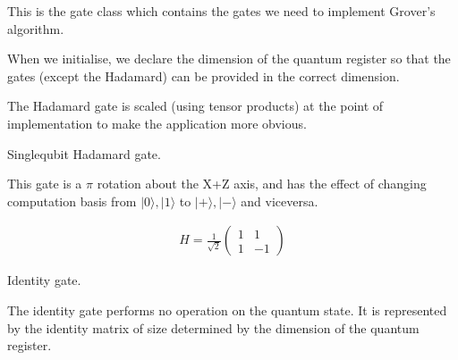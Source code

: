 \documentclass[letterpaper,10pt,english]{sphinxmanual}
\begin{document}
\begin{fulllineitems}
\label{\detokenize{index:gates.Gate}}
\pysigstartsignatures
{}
\pysigstopsignatures
\sphinxAtStartPar
This is the gate class which contains the gates we need to implement
Grover’s algorithm.

\sphinxAtStartPar
When we initialise, we declare the dimension of the quantum
register so that the gates (except the Hadamard) can be provided in
the correct dimension.

\sphinxAtStartPar
The Hadamard gate is scaled (using tensor products) at the point
of implementation to make the application more obvious.

\begin{fulllineitems}
\label{\detokenize{index:gates.Gate.h}}
\pysigstartsignatures
{}
\pysigstopsignatures
\sphinxAtStartPar
Single\sphinxhyphen{}qubit Hadamard gate.

\sphinxAtStartPar
This gate is a \(\pi\) rotation about the X+Z axis, and has the effect
of changing computation basis from \(|0\rangle,|1\rangle\) to
\(|+\rangle,|-\rangle\) and vice\sphinxhyphen{}versa.

\sphinxAtStartPar
{}
\begin{equation*}
\begin{split}H = \frac{1}{\sqrt{2}}
    \begin{pmatrix}
        1 & 1 \\
        1 & -1
    \end{pmatrix}\end{split}
\end{equation*}
\end{fulllineitems}


\begin{fulllineitems}
\label{\detokenize{index:gates.Gate.i}}
\pysigstartsignatures
{}
\pysigstopsignatures
\sphinxAtStartPar
Identity gate.

\sphinxAtStartPar
The identity gate performs no operation on the quantum state. It is
represented by the identity matrix of size determined by the dimension
of the quantum register.


\end{fulllineitems}
\end{fulllineitems}
\end{document}
